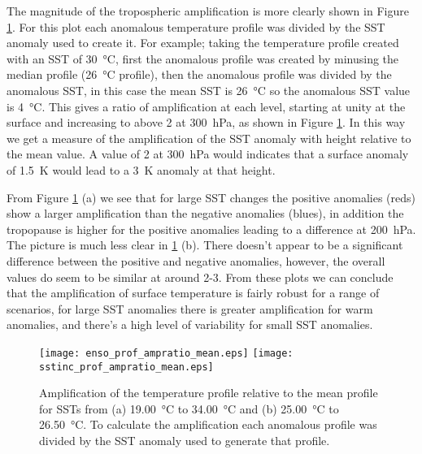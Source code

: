 The magnitude of the tropospheric amplification is more clearly shown in Figure 
\ref{fig:scmsstamp}. For this plot each anomalous temperature profile was 
divided by the SST anomaly used to create it. For example; taking the 
temperature profile created with an SST of \SI{30}{\degreeCelsius}, first the 
anomalous profile was created by minusing the median profile 
(\SI{26}{\degreeCelsius} profile), then the anomalous profile was divided by the 
anomalous SST, in this case the mean SST is \SI{26}{\celsius} so the anomalous 
SST value is \SI{4}{\celsius}.  This gives a ratio of amplification at each 
level, starting at unity at the surface and increasing to above 2 at 
\SI{300}{\hecto\pascal}, as shown in Figure \ref{fig:scmsstamp}.  In this way we 
get a measure of the amplification of the SST anomaly with height relative to 
the mean value.  A value of 2 at \SI{300}{\hecto\pascal} would indicates that a 
surface anomaly of \SI{1.5}{\kelvin} would lead to a \SI{3}{\kelvin} anomaly at 
that height.  

From Figure \ref{fig:scmsstamp} (a) we see that for large SST changes the 
positive anomalies (reds) show a larger amplification than the negative 
anomalies (blues), in addition the tropopause is higher for the positive 
anomalies leading to a difference at \SI{200}{\hecto\pascal}. The picture is 
much less clear in \ref{fig:scmsstamp} (b). There doesn't appear to be a 
significant difference between the positive and negative anomalies, however, the 
overall values do seem to be similar at around 2-3. From these plots we can 
conclude that the amplification of surface temperature is fairly robust for a 
range of scenarios, for large SST anomalies there is greater amplification for 
warm anomalies, and there's a high level of variability for small SST anomalies.

\begin{figure}[ht]
\texttt{[image: enso\_prof\_ampratio\_mean.eps]}
\texttt{[image: sstinc\_prof\_ampratio\_mean.eps]}\\
\caption{Amplification of the temperature profile relative to the mean profile 
	for SSTs from (a) \SI{19.00}{\degreeCelsius} to \SI{34.00}{\degreeCelsius} 
and (b) \SI{25.00}{\degreeCelsius} to \SI{26.50}{\degreeCelsius}. To calculate 
the amplification each anomalous profile was divided by the SST anomaly used to 
generate that profile.}
\label{fig:scmsstamp}
\end{figure}

